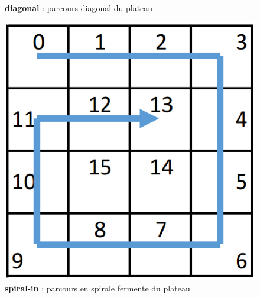 \begin{figure}[H]
		\caption{\textbf{diagonal} : parcours diagonal du plateau}\label{fig:parcours_diagonal}
		\endminipage\hfill
		\includegraphics[width=\linewidth]{images/parcours_spiral-in.png}
		\caption{\textbf{spiral-in} : parcours en spirale fermente du plateau}\label{fig:parcours_spiral-in}
		\endminipage\hfill
	\end{figure}
